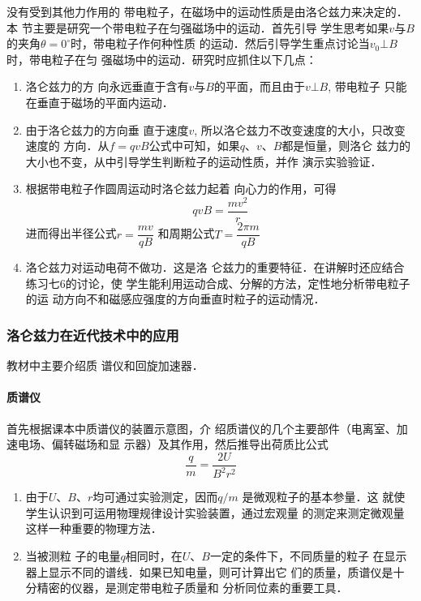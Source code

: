 没有受到其他力作用的
带电粒子，在磁场中的运动性质是由洛仑兹力来决定的．本
节主要是研究一个带电粒子在匀强磁场中的运动．首先引导
学生思考如果$v$与$B$的夹角$\theta=0^{\circ}$时，带电粒子作何种性质
的运动．然后引导学生重点讨论当$v_0\bot B$时，带电粒子在匀
强磁场中的运动．研究时应抓住以下几点：
\begin{enumerate}
\item 洛仑兹力的方
向永远垂直于含有$v$与$B$的平面，而且由于$v\bot B$, 带电粒子
只能在垂直于磁场的平面内运动．    
\item 由于洛仑兹力的方向垂
直于速度$v$, 所以洛仑兹力不改变速度的大小，只改变速度的
方向．从$f=qvB$公式中可知，如果$q$、$v$、$B$都是恒量，则洛仑
兹力的大小也不变，从中引导学生判断粒子的运动性质，并作
演示实验验证．    
\item 根据带电粒子作圆周运动时洛仑兹力起着
向心力的作用，可得 
\[qvB=\frac{mv^2}{r}\]
进而得出半径公式$r=\dfrac{mv}{qB}$
和周期公式$T=\dfrac{2\pi m}{qB}$
\item 洛仑兹力对运动电荷不做功．这是洛
仑兹力的重要特征．在讲解时还应结合练习七6的讨论，使
学生能利用运动合成、分解的方法，定性地分析带电粒子的运
动方向不和磁感应强度的方向垂直时粒子的运动情况．
\end{enumerate}



\subsubsection{洛仑兹力在近代技术中的应用}

教材中主要介绍质
谱仪和回旋加速器．

\paragraph{质谱仪} 
首先根据课本中质谱仪的装置示意图，介
绍质谱仪的几个主要部件（电离室、加速电场、偏转磁场和显
示器）及其作用，然后推导出荷质比公式
\[\frac{q}{m}=\frac{2U}{B^2r^2}\]

\begin{enumerate}
\item 由于$U$、$B$、$r$均可通过实验测定，因而$q/m$
是微观粒子的基本参量．这
就使学生认识到可运用物理规律设计实验装置，通过宏观量
的测定来测定微观量这样一种重要的物理方法．    
\item 当被测粒
子的电量$q$相同时，在$U$、$B$一定的条件下，不同质量的粒子
在显示器上显示不同的谱线．如果已知电量，则可计算出它
们的质量，质谱仪是十分精密的仪器，是测定带电粒子质量和
分析同位素的重要工具．
\end{enumerate}

